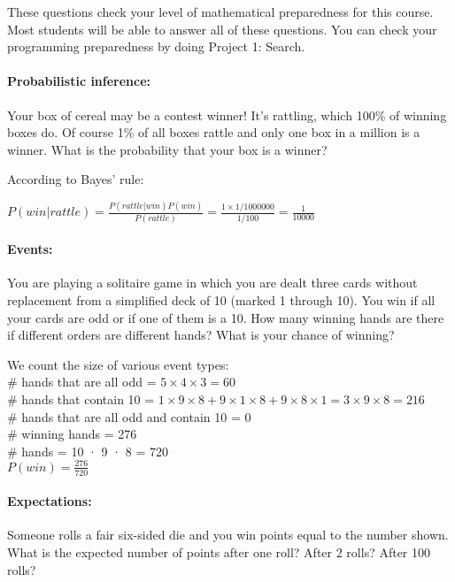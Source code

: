 \documentclass[12pt,twoside]{article}
\begin{document}


These questions check your level of mathematical preparedness for this course. Most students will be able to answer all of these questions. You can check your programming preparedness by doing Project 1: Search. 



\paragraph{Probabilistic inference:} Your box of cereal may be a contest winner! It’s rattling, which 100\% of winning boxes do. Of course 1\% of all boxes rattle and only one box in a million is a winner. What is the probability that your box is a winner?

{\color{red}
According to Bayes’ rule:

$P(win|rattle)=\frac{P(rattle|win)P(win)}{P(rattle)}=\frac{1\times1/1000000}{1/100}=\frac{1}{10000}$

}

\paragraph{Events:} You are playing a solitaire game in which you are dealt three cards without replacement from a simplified deck of 10 (marked 1 through 10). You win if all your cards are odd or if one of them is a 10. How many winning hands are there if different orders are different hands? What is your chance of winning?

{\color{red}
	We count the size of various event types:\\
	\# hands that are all odd = $5 \times 4 \times 3 = 60$\\
	\# hands that contain 10 = $1 \times 9 \times 8 + 9 \times 1 \times 8 + 9 \times 8 \times 1 = 3 \times 9 \times 8 = 216$\\
	\# hands that are all odd and contain 10 = 0\\
	\# winning hands = 276\\
	\# hands = 10 · 9 · 8 = 720\\
	$P(win)=\frac{276}{720}$

}

\paragraph{Expectations:} Someone rolls a fair six-sided die and you win points equal to the number shown. What is the expected number of points after one roll? After 2 rolls? After 100 rolls?
\end{document}
